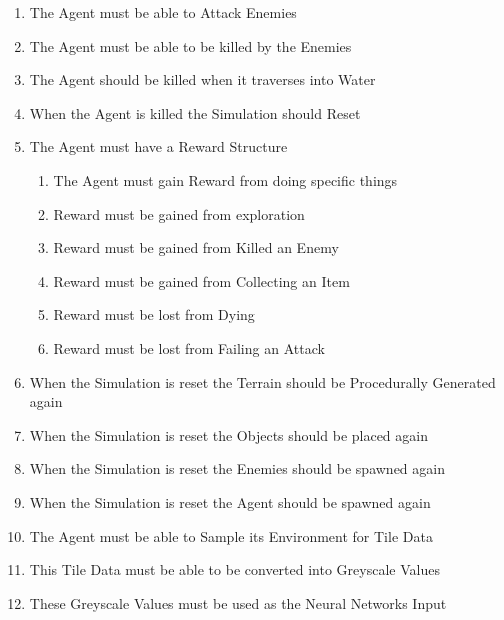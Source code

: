 \begin{flushleft}
\begin{enumerate}
\begin{enumerate}
                    \item The Agent must be able to Attack Enemies
                    \item The Agent must be able to be killed by the Enemies
                    \item The Agent should be killed when it traverses into Water
                    \item When the Agent is killed the Simulation should Reset
                    \item The Agent must have a Reward Structure
                    \begin{enumerate}
                        \item The Agent must gain Reward from doing specific things
                        \item Reward must be gained from exploration
                        \item Reward must be gained from Killed an Enemy
                        \item Reward must be gained from Collecting an Item
                        \item Reward must be lost from Dying
                        \item Reward must be lost from Failing an Attack
                    \end{enumerate}
                    \item When the Simulation is reset the Terrain should be Procedurally Generated again
                    \item When the Simulation is reset the Objects should be placed again
                    \item When the Simulation is reset the Enemies should be spawned again
                    \item When the Simulation is reset the Agent should be spawned again
                    \item The Agent must be able to Sample its Environment for Tile Data
                    \item This Tile Data must be able to be converted into Greyscale Values
                    \item These Greyscale Values must be used as the Neural Networks Input
                \end{enumerate}


\end{enumerate}
\end{flushleft}

